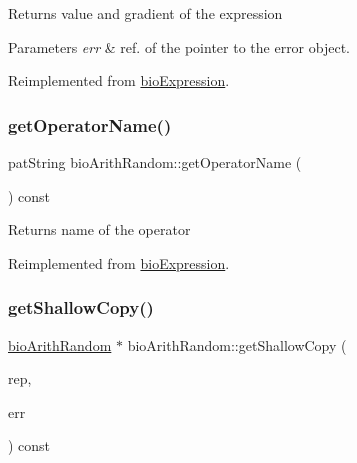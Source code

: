 \begin{DoxyReturn}{Returns}
value and gradient of the expression 
\end{DoxyReturn}

\begin{DoxyParams}{Parameters}
{\em err} & ref. of the pointer to the error object. \\
\hline
\end{DoxyParams}


Reimplemented from \hyperlink{classbio_expression_a91c81ce80c9e972c913b10f5f3c1ed13}{bio\+Expression}.

\mbox{\label{classbio_arith_random_a0f83701f05a22956b5c4fff431c40895}} 
\subsubsection{\texorpdfstring{get\+Operator\+Name()}{getOperatorName()}}
{\footnotesize\ttfamily pat\+String bio\+Arith\+Random\+::get\+Operator\+Name (\begin{DoxyParamCaption}{ }\end{DoxyParamCaption}) const\hspace{0.3cm}{\ttfamily [virtual]}}

\begin{DoxyReturn}{Returns}
name of the operator 
\end{DoxyReturn}


Reimplemented from \hyperlink{classbio_expression_a2353a4afb3a2b0af7c63aba086a72bde}{bio\+Expression}.

\mbox{\label{classbio_arith_random_aef00154ab54de9ed4acd1cf45d9036ce}} 
\subsubsection{\texorpdfstring{get\+Shallow\+Copy()}{getShallowCopy()}}
{\footnotesize\ttfamily \hyperlink{classbio_arith_random}{bio\+Arith\+Random} $\ast$ bio\+Arith\+Random\+::get\+Shallow\+Copy (\begin{DoxyParamCaption}\item[{\hyperlink{classbio_expression_repository}{bio\+Expression\+Repository} $\ast$}]{rep,  }\item[{pat\+Error $\ast$\&}]{err }\end{DoxyParamCaption}) const\hspace{0.3cm}{\ttfamily [virtual]}}

